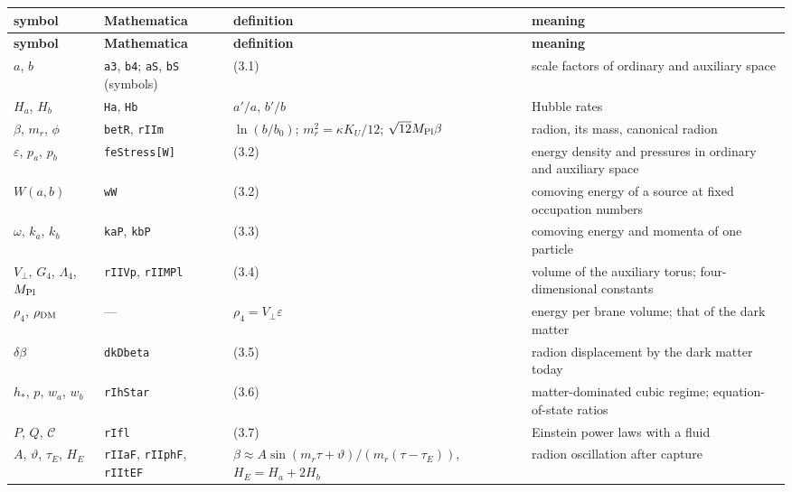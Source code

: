 \documentclass[10pt,a4paper]{article}
\begin{document}
{\small
\begin{longtable}{>{\raggedright\arraybackslash}p{}>{\raggedright\arraybackslash}p{}>{\raggedright\arraybackslash}p{}>{\raggedright\arraybackslash}p{}}
\toprule
\textbf{symbol} & \textbf{Mathematica} & \textbf{definition} & \textbf{meaning} \\
\midrule\endfirsthead
\toprule
\textbf{symbol} & \textbf{Mathematica} & \textbf{definition} & \textbf{meaning} \\
\midrule\endhead
\endfoot
\bottomrule\endlastfoot
$a$, $b$ & \texttt{a3}, \texttt{b4}; \texttt{aS}, \texttt{bS} (symbols) & (3.1) & scale factors of ordinary and auxiliary space \\
$H_a$, $H_b$ & \texttt{Ha}, \texttt{Hb} & $a'/a$, $b'/b$ & Hubble rates \\
$\beta$, $m_r$, $\phi$ & \texttt{betR}, \texttt{rIIm} & $\ln(b/b_0)$; $m_r^2=\kappa K_U/12$; $\sqrt{12}M_{\rm Pl}\beta$ & radion, its mass, canonical radion \\
$\varepsilon$, $p_a$, $p_b$ & \texttt{feStress[W]} & (3.2) & energy density and pressures in ordinary and auxiliary space \\
$W(a,b)$ & \texttt{wW} & (3.2) & comoving energy of a source at fixed occupation numbers \\
$\omega$, $k_a$, $k_b$ & \texttt{kaP}, \texttt{kbP} & (3.3) & comoving energy and momenta of one particle \\
$V_\perp$, $G_4$, $\Lambda_4$, $M_{\rm Pl}$ & \texttt{rIIVp}, \texttt{rIIMPl} & (3.4) & volume of the auxiliary torus; four-dimensional constants \\
$\rho_4$, $\rho_{\rm DM}$ & — & $\rho_4=V_\perp\varepsilon$ & energy per brane volume; that of the dark matter \\
$\delta\beta$ & \texttt{dkDbeta} & (3.5) & radion displacement by the dark matter today \\
$h_*$, $p$, $w_a$, $w_b$ & \texttt{rIhStar} & (3.6) & matter-dominated cubic regime; equation-of-state ratios \\
$P$, $Q$, $\mathcal C$ & \texttt{rIfl} & (3.7) & Einstein power laws with a fluid \\
$A$, $\vartheta$, $\tau_E$, $H_E$ & \texttt{rIIaF}, \texttt{rIIphF}, \texttt{rIItEF} & $\beta\approx A\sin(m_r\tau+\vartheta)/(m_r(\tau-\tau_E))$, $H_E=H_a+2H_b$ & radion oscillation after capture \\

\end{longtable}}
\end{document}
